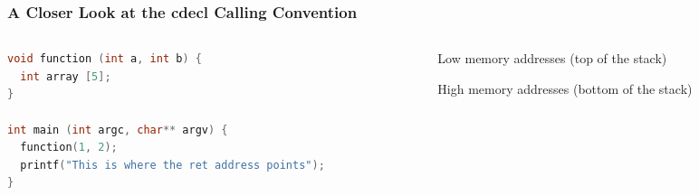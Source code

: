 \documentclass[]{beamer}
\begin{document}
\begin{frame}[fragile]
  \frametitle{A Closer Look at the cdecl Calling Convention}
  \begin{columns}
    \begin{column}{.5\textwidth}
\begin{lstlisting}[language=C]
void function (int a, int b) {
  int array [5];
}

int main (int argc, char** argv) {
  function(1, 2);
  printf("This is where the ret address points");
}
\end{lstlisting}
    \end{column}
    \begin{column}{.5\textwidth}
      \begin{center}
        {\tiny Low memory addresses (top of the stack)}
        \begin{center}
        \end{center}
        {\tiny High memory addresses (bottom of the stack)}
      \end{center}

    \end{column}
  \end{columns}
\end{frame}
\end{document}
